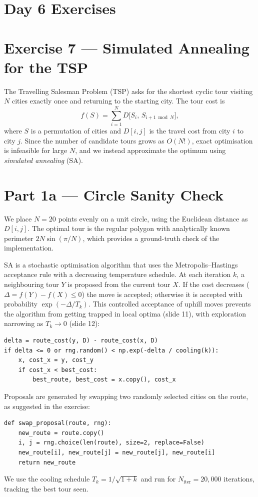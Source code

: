 \newpage
\section*{Day 6 Exercises}
\section*{Exercise 7 --- Simulated Annealing for the TSP}

The Travelling Salesman Problem (TSP) asks for the shortest cyclic tour
visiting $N$ cities exactly once and returning to the starting city. The
tour cost is
\begin{equation}
    f(S) = \sum_{i=1}^{N} D\bigl[S_i,\, S_{i+1 \bmod N}\bigr],
    \label{eq:tourcost}
\end{equation}
where $S$ is a permutation of cities and $D[i,j]$ is the travel cost from
city $i$ to city $j$. Since the number of candidate tours grows as $O(N!)$,
exact optimisation is infeasible for large $N$, and we instead approximate
the optimum using \emph{simulated annealing} (SA).

\section*{Part 1a --- Circle Sanity Check}

We place $N = 20$ points evenly on a unit circle, using the Euclidean
distance as $D[i,j]$. The optimal tour is the regular polygon with
analytically known perimeter $2N\sin(\pi/N)$, which provides a ground-truth
check of the implementation.

SA is a stochastic optimisation algorithm that uses the Metropolis--Hastings
acceptance rule with a decreasing temperature schedule. At each iteration
$k$, a neighbouring tour $Y$ is proposed from the current tour $X$. If the
cost decreases ($\Delta = f(Y) - f(X) \le 0$) the move is accepted;
otherwise it is accepted with probability $\exp(-\Delta / T_k)$. This
controlled acceptance of uphill moves prevents the algorithm from getting
trapped in local optima (slide 11), with exploration narrowing as
$T_k \to 0$ (slide 12):
\begin{verbatim}
delta = route_cost(y, D) - route_cost(x, D)
if delta <= 0 or rng.random() < np.exp(-delta / cooling(k)):
    x, cost_x = y, cost_y
    if cost_x < best_cost:
        best_route, best_cost = x.copy(), cost_x
\end{verbatim}
Proposals are generated by swapping two randomly selected cities on the
route, as suggested in the exercise:
\begin{verbatim}
def swap_proposal(route, rng):
    new_route = route.copy()
    i, j = rng.choice(len(route), size=2, replace=False)
    new_route[i], new_route[j] = new_route[j], new_route[i]
    return new_route
\end{verbatim}
We use the cooling schedule $T_k = 1/\sqrt{1+k}$ and run for
$N_{\mathrm{iter}} = 20{,}000$ iterations, tracking the best tour seen.

